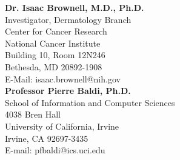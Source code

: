 \documentclass[margin,line]{res}
\begin{document}
\begin{resume}
\textbf{Dr. Isaac Brownell, M.D., Ph.D.}\\
Investigator, Dermatology Branch\\
Center for Cancer Research\\
National Cancer Institute\\
Building 10, Room 12N246\\
Bethesda, MD 20892-1908\\
E-Mail: isaac.brownell@nih.gov\\

\textbf{Professor Pierre Baldi, Ph.D.}\\
School of Information and Computer Sciences\\
4038 Bren Hall\\
University of California, Irvine\\
Irvine, CA 92697-3435\\
E-mail: pfbaldi@ics.uci.edu\\

\end{resume}
\end{document}
